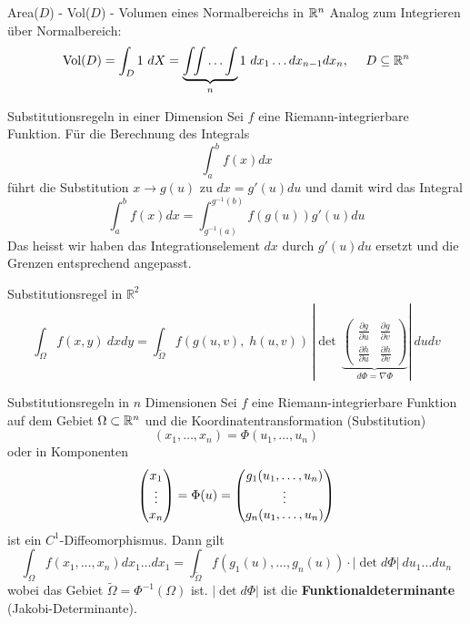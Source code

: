 \begin{Rezept}{Area($D$) - Vol($D$) - Volumen eines Normalbereichs in $\mathbb{R}^n$}{}
Analog zum Integrieren über Normalbereich:
\[ \text{Vol}(D) = \int_D 1 ~ dX = \underbrace{\int \!\! \int \ldots \int}_{n} 1 ~ dx_1 \ldots dx_{n-1} dx_n,  ~~~~ D \subseteq \mathbb{R}^n\]
\end{Rezept}



\begin{Satz}{Substitutionsregeln in einer Dimension}{}
    Sei $f$ eine Riemann-integrierbare Funktion. Für die Berechnung des Integrals
    \[
        \int_a^b f(x) dx
    \]
    führt die Substitution $x \to g(u)$ zu $dx = g'(u)du$ und damit wird das Integral
    \[
        \int_a^b f(x) dx = \int_{g^{-1}(a)}^{g^{-1}(b)} f(g(u)) g'(u) du
    \]
    Das heisst wir haben das Integrationselement $dx$ durch $g'(u)du$ ersetzt und die Grenzen entsprechend angepasst.
\end{Satz}


\begin{Satz}{Substitutionsregel in $\mathbb{R}^2$}{}
\[
\int_{\Omega} f(x,y) ~ dx dy = \int_{\widetilde{\Omega}} f(g(u, v), \; h(u, v)) \, 
		\left\lvert\det \, \underbrace{\begin{pmatrix}
			\frac{\partial g}{\partial u} & \frac{\partial g}{\partial v}\\
			\frac{\partial h}{\partial u} & \frac{\partial h}{\partial v}
		\end{pmatrix}}_{d\Phi = \nabla\Phi} \right\rvert
	~ du dv
\]
\end{Satz}



\begin{Satz}{Substitutionsregeln in $n$ Dimensionen}{}
    Sei $f$ eine Riemann-integrierbare Funktion auf dem Gebiet $\Omega \subset \mathbb{R}^n$ und die Koordinatentransformation (Substitution)
    \[
    (x_1,\hdots,x_n) = \Phi(u_1, \hdots,  u_n)
    \]
    oder in Komponenten
    \[
        \begin{pmatrix} x_1 \\ \vdots \\ x_n \end{pmatrix}
        = \Phi(u)
        = \begin{pmatrix} g_1(u_1,\hdots,u_n) \\ \vdots \\ g_n(u_1,\hdots,u_n) \end{pmatrix}
    \]
    ist ein $C^1$-Diffeomorphismus. Dann gilt
    \[
        \int_\Omega f(x_1, \hdots, x_n)dx_1\hdots dx_1 = \int_{\widetilde{\Omega}} f(g_1(u), \hdots, g_n(u)) \cdot |\det d \Phi|\ du_1\hdots du_n
    \]
    wobei das Gebiet $\widetilde{\Omega} = \Phi^{-1}(\Omega)$ ist. $|\det d\Phi|$ ist die \textbf{Funktionaldeterminante} (Jakobi-Determinante).
\end{Satz}

